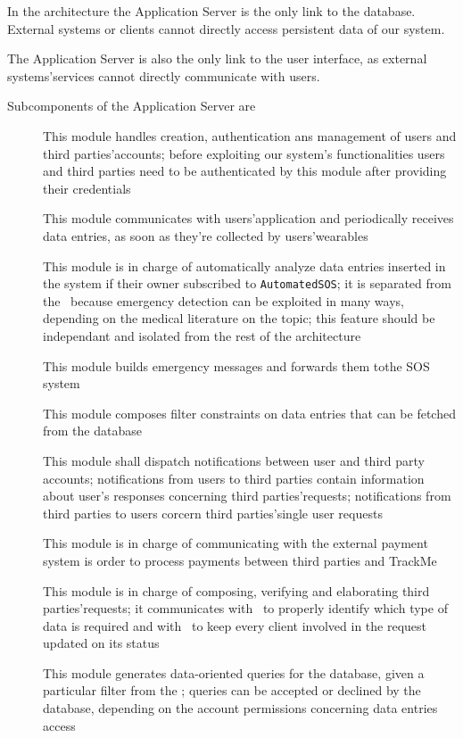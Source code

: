 \documentclass[../DD0.tex]{subfiles}
\begin{document}
        In the architecture the Application Server is the only link to the database. External systems or clients cannot directly access persistent data of our system.

        The Application Server is also the only link to the user interface, as external systems'services cannot directly communicate with users.

        Subcomponents of the Application Server are
        \begin{description}
          \item[\AccountManager] This module handles creation, authentication ans management of users and third parties'accounts; before exploiting our system's functionalities users and third parties need to be authenticated by this module after providing their credentials
          \item[\DataCollector] This module communicates with users'application and periodically receives data entries, as soon as they're collected by users'wearables
          \item[\EmergencyDetector] This module is in charge of automatically analyze data entries inserted in the system if their owner subscribed to \texttt{AutomatedSOS}; it is separated from the \DataCollector\ because emergency detection can be exploited in many ways, depending on the medical literature on the topic; this feature should be independant and isolated from the rest of the architecture
          \item[\EmergencyDispatcher] This module builds emergency messages and forwards them tothe SOS system
          \item[\FilterManager] This module composes filter constraints on data entries that can be fetched from the database
          \item[\NotificationManager] This module shall dispatch notifications between user and third party accounts; notifications from users to third parties contain information about user's responses concerning third parties'requests; notifications from third parties to users corcern third parties'single user requests
          \item[\PaymentGateway] This module is in charge of communicating with the external payment system is order to process payments between third parties and TrackMe
          \item[\RequestManager] This module is in charge of composing, verifying and elaborating third parties'requests; it communicates with \FilterManager\ to properly identify which type of data is required and with \NotificationManager\ to keep every client involved in the request updated on its status
          \item[\SetBuilder] This module generates data-oriented queries for the database, given a particular filter from the \FilterManager; queries can be accepted or declined by the database, depending on the account permissions concerning data entries access
        \end{description}
\end{document}
